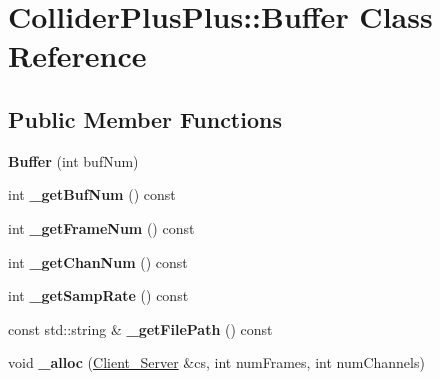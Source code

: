 \hypertarget{classColliderPlusPlus_1_1Buffer}{\section{Collider\-Plus\-Plus\-:\-:Buffer Class Reference}
\label{classColliderPlusPlus_1_1Buffer}
}
\subsection*{Public Member Functions}
\begin{DoxyCompactItemize}
\item 
\hypertarget{classColliderPlusPlus_1_1Buffer_aea5b364a9ec1815f0dd3746d8577a986}{{\bfseries Buffer} (int buf\-Num)}\label{classColliderPlusPlus_1_1Buffer_aea5b364a9ec1815f0dd3746d8577a986}

\item 
\hypertarget{classColliderPlusPlus_1_1Buffer_a6d2eb844b20eb62158d5d77bcb5d568c}{int {\bfseries \-\_\-get\-Buf\-Num} () const }\label{classColliderPlusPlus_1_1Buffer_a6d2eb844b20eb62158d5d77bcb5d568c}

\item 
\hypertarget{classColliderPlusPlus_1_1Buffer_adbd84c84d0c13d9dcc96e36edce17448}{int {\bfseries \-\_\-get\-Frame\-Num} () const }\label{classColliderPlusPlus_1_1Buffer_adbd84c84d0c13d9dcc96e36edce17448}

\item 
\hypertarget{classColliderPlusPlus_1_1Buffer_a1eca16cfed94680f3a14adcd4dfe42c9}{int {\bfseries \-\_\-get\-Chan\-Num} () const }\label{classColliderPlusPlus_1_1Buffer_a1eca16cfed94680f3a14adcd4dfe42c9}

\item 
\hypertarget{classColliderPlusPlus_1_1Buffer_a6887218a82f341f668117cd24548921a}{int {\bfseries \-\_\-get\-Samp\-Rate} () const }\label{classColliderPlusPlus_1_1Buffer_a6887218a82f341f668117cd24548921a}

\item 
\hypertarget{classColliderPlusPlus_1_1Buffer_a94c409839084712d7cc10fd46e520d68}{const std\-::string \& {\bfseries \-\_\-get\-File\-Path} () const }\label{classColliderPlusPlus_1_1Buffer_a94c409839084712d7cc10fd46e520d68}

\item 
\hypertarget{classColliderPlusPlus_1_1Buffer_a910866172f991f67da5b6a258cfe91b7}{void {\bfseries \-\_\-alloc} (\hyperlink{classColliderPlusPlus_1_1Client__Server}{Client\-\_\-\-Server} \&cs, int num\-Frames, int num\-Channels)}\label{classColliderPlusPlus_1_1Buffer_a910866172f991f67da5b6a258cfe91b7}


\end{DoxyCompactItemize}
